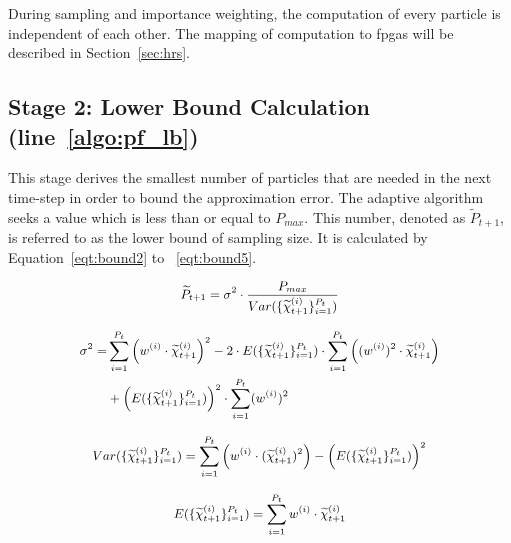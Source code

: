 During sampling and importance weighting, the computation of every particle is independent of each other. 
The mapping of computation to \gls{fpga}s will be described in Section~\ref{sec:hrs}.

\subsection{Stage 2: Lower Bound Calculation (line~\ref{algo:pf_lb})} 
This stage derives the smallest number of particles that are needed in the next time-step in order to bound the approximation error.
The adaptive algorithm seeks a value which is less than or equal to $P_{max}$.
This number, denoted as $\widetilde{P}_{t+1}$, is referred to as the lower bound of sampling size.
It is calculated by Equation~\ref{eqt:bound2} to ~\ref{eqt:bound5}.

\begin{equation}
\small
\begin{aligned}
\widetilde{P}_{t+1} = \sigma^2 \cdot \frac{P_{max}}{Var(\{\widetilde{\chi}_{t+1}^{(i)}\}^{P_t}_{i=1})}
\end{aligned}
\label{eqt:bound2}
\end{equation}

\begin{eqnarray}
\small
\begin{aligned}
\sigma^2 = & \sum_{i=1}^{P_{t}}\left({w}^{(i)} \cdot \widetilde{\chi}_{t+1}^{(i)} \right)^2 - 2 \cdot E(\{\widetilde{\chi}_{t+1}^{(i)}\}^{P_t}_{i=1}) \cdot \sum_{i=1}^{P_{t}} \left ( ({w}^{(i)})^2 \cdot \widetilde{\chi}_{t+1}^{(i)} \right ) \\
& + \left(E(\{\widetilde{\chi}_{t+1}^{(i)}\}^{P_t}_{i=1})\right)^2 \cdot \sum_{i=1}^{P_{t}}({w}^{(i)})^2
\end{aligned}
\label{eqt:bound3}
\end{eqnarray}

\begin{equation}
\small
\begin{aligned}
Var(\{\widetilde{\chi}_{t+1}^{(i)}\}^{P_t}_{i=1}) = \sum_{i=1}^{P_{t}} \left ( {w}^{(i)} \cdot (\widetilde{\chi}_{t+1}^{(i)})^2 \right ) - \left( E(\{\widetilde{\chi}_{t+1}^{(i)}\}^{P_t}_{i=1}) \right)^2
\end{aligned}
\label{eqt:bound4}
\end{equation}

\begin{equation}
\small
\begin{aligned}
E(\{\widetilde{\chi}_{t+1}^{(i)}\}^{P_t}_{i=1}) = \sum_{i=1}^{P_{t}} {w}^{(i)} \cdot \widetilde{\chi}_{t+1}^{(i)}
\end{aligned}
\label{eqt:bound5}
\end{equation}


